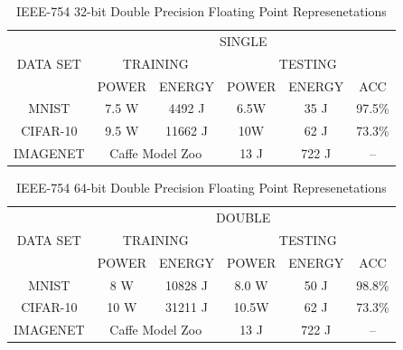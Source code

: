 \documentclass[letterpaper, 10 pt, conference]{ieeeconf}
\begin{document}
\begin{table}[ht]
  \centering
  \caption{IEEE-754 32-bit Double Precision Floating Point Represenetations}
  \label{my-label}
  \begin{tabular}{|c|c|c|c|c|c|}
    \hline
    \multirow{3}{*}{DATA SET} & \multicolumn{5}{c|}{SINGLE}                                                     \\ \cline{2-6} 
                              & \multicolumn{2}{c|}{TRAINING}                    & \multicolumn{3}{c|}{TESTING} \\ \cline{2-6} 
                              & POWER                  & ENERGY                  & POWER  & ENERGY  & ACC  \\ \hline
    MNIST                     & 7.5 W                  & 4492 J                  & 6.5W   & 35 J    & 97.5\%    \\ \hline
    CIFAR-10                     & 9.5 W                  & 11662 J                 & 10W    & 62 J    & 73.3\%    \\ \hline
    IMAGENET                  & \multicolumn{2}{c|}{Caffe Model Zoo}             & 13 J   & 722 J   & --        \\ \hline
  \end{tabular}
\end{table}

\begin{table}[ht]
  \centering
  \caption{IEEE-754 64-bit Double Precision Floating Point Represenetations}
  \label{my-label}
  \begin{tabular}{|c|c|c|c|c|c|}
    \hline
    \multirow{3}{*}{DATA SET} & \multicolumn{5}{c|}{DOUBLE}                                                     \\ \cline{2-6} 
                              & \multicolumn{2}{c|}{TRAINING}                    & \multicolumn{3}{c|}{TESTING} \\ \cline{2-6} 
                              & POWER                  & ENERGY                  & POWER  & ENERGY  & ACC  \\ \hline
    MNIST                     & 8 W                    & 10828 J                 & 8.0 W  & 50 J    & 98.8\%    \\ \hline
    CIFAR-10                     & 10 W                   & 31211 J                 & 10.5W  & 62 J    & 73.3\%    \\ \hline
    IMAGENET                  & \multicolumn{2}{c|}{Caffe Model Zoo}             & 13 J   & 722 J   & --        \\ \hline
  \end{tabular}
\end{table}
\end{document}
